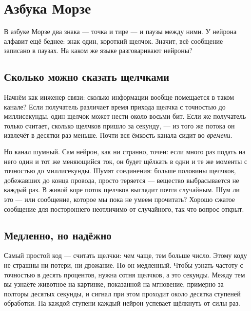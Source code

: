\chapter{Азбука Морзе}

В азбуке Морзе два знака --- точка и тире --- и паузы между ними. У нейрона алфавит ещё беднее: знак один, короткий щелчок. Значит, всё сообщение записано в паузах. На каком же языке разговаривают нейроны?

\section*{Сколько можно сказать щелчками}

Начнём как инженер связи: сколько информации вообще помещается в таком канале? Если получатель различает время прихода щелчка с точностью до миллисекунды, один щелчок может нести около восьми бит. Если же получатель только считает, сколько щелчков пришло за секунду, --- из того же потока он извлечёт в десятки раз меньше. Почти вся ёмкость канала сидит во \emph{времени}.


Но канал шумный. Сам нейрон, как ни странно, точен: если много раз подать на него один и тот же меняющийся ток, он будет щёлкать в одни и те же моменты с точностью до миллисекунды. Шумят соединения: больше половины щелчков, добежавших до конца провода, просто теряется --- вещество выбрасывается не каждый раз. В живой коре поток щелчков выглядит почти случайным. Шум ли это --- или сообщение, которое мы пока не умеем прочитать? Хорошо сжатое сообщение для постороннего неотличимо от случайного, так что вопрос открыт.

\section*{Медленно, но надёжно}

Самый простой код --- считать щелчки: чем чаще, тем больше число. Этому коду не страшны ни потери, ни дрожание. Но он медленный. Чтобы узнать частоту с точностью в десять процентов, нужна сотня щелчков, а это секунды. Между тем вы узнаёте животное на картинке, показанной на мгновение, примерно за полторы десятых секунды, и сигнал при этом проходит около десятка ступеней обработки. На каждой ступени каждый нейрон успевает щёлкнуть от силы раз.

